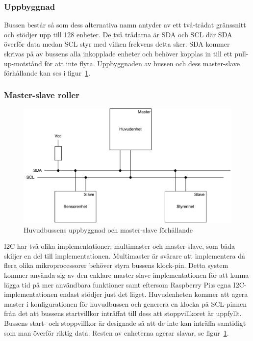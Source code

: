\documentclass{article}
\begin{document}
\subsubsection{Uppbyggnad}
Bussen består så som dess alternativa namn antyder av ett två-trådat gränssnitt och stödjer upp till 128 enheter. De två trådarna är SDA och SCL där SDA överför data medan SCL styr med vilken frekvens detta sker. SDA kommer skrivas på av bussens alla inkopplade enheter och behöver kopplas in till ett pull-up-motstånd för att inte flyta. Uppbyggnaden av bussen och dess master-slave förhållande kan ses i figur~\ref{fig:huvudbuss_masterslave}.

\subsubsection{Master-slave roller}
\begin{figure}[H]
\centering 
\includegraphics[scale=0.56]{Huvudbuss}
\caption{Huvudbussens uppbyggnad och master-slave förhållande}
\label{fig:huvudbuss_masterslave}
\end{figure}

I2C har två olika implementationer: multimaster och master-slave, som båda skiljer en del till implementationen. Multimaster är svårare att implementera då flera olika mikroprocessorer behöver styra bussens klock-pin. Detta system kommer använda sig av den enklare master-slave-implementationen för att kunna lägga tid på mer användbara funktioner samt eftersom Raspberry Pi:s egna I2C-implementationen endast stödjer just det läget. Huvudenheten kommer att agera master i konfigurationen för huvudbussen och generera en klocka på SCL-pinnen från det att bussens startvillkor inträffat till dess att stoppvillkoret är uppfyllt. Bussens start- och stoppvillkor är designade så att de inte kan inträffa samtidigt som man överför riktig data. Resten av enheterna agerar slavar, se figur~\ref{fig:huvudbuss_masterslave}.
\end{document}
